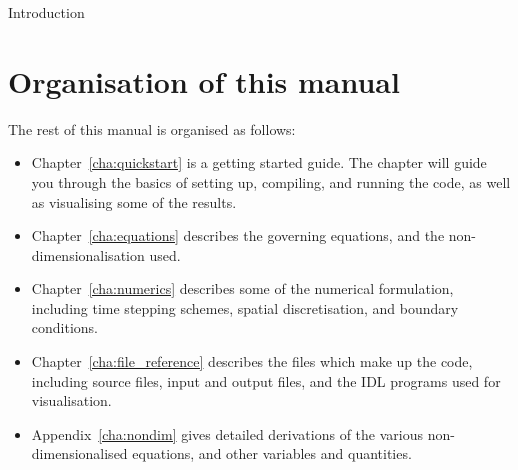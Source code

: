 \begin{chapter}{\label{cha:introduction}Introduction}
  \section{Organisation of this manual}
  The rest of this manual is organised as follows:
  \begin{itemize}
    \item Chapter~\ref{cha:quickstart} is a getting started guide.  The chapter
      will guide you through the basics of setting up, compiling, and running
      the code, as well as visualising some of the results.
    \item Chapter~\ref{cha:equations} describes the governing equations, and
      the non-dimensionalisation used.
    \item Chapter~\ref{cha:numerics} describes some of the numerical
      formulation, including time stepping schemes, spatial discretisation, and
      boundary conditions.
    \item Chapter~\ref{cha:file_reference} describes the files which make up
      the code, including source files, input and output files, and the IDL
      programs used for visualisation.
    \item Appendix~\ref{cha:nondim} gives detailed derivations of the various
      non-dimensionalised equations, and other variables and quantities.
  \end{itemize}
\end{chapter}
